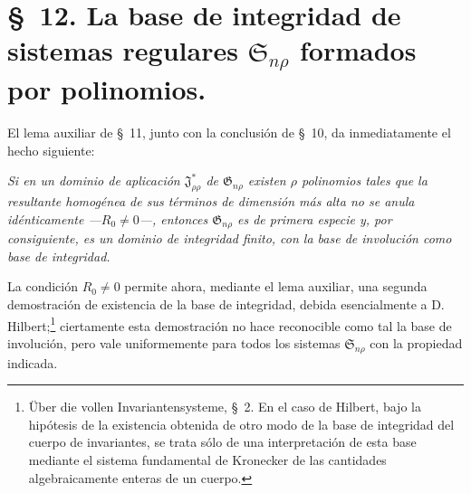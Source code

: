 \documentclass[11pt]{article}
\providecommand{\Ssys}{\mathfrak{S}}
\providecommand{\Jdom}{\mathfrak{J}}
\providecommand{\Gdom}{\mathfrak{G}}
\begin{document}
\section*{\S\ 12. La base de integridad de sistemas regulares $\Ssys_{n\rho}$ formados por polinomios.}

El lema auxiliar de \S\ 11, junto con la conclusión de \S\ 10, da inmediatamente el hecho siguiente:

\emph{Si en un dominio de aplicación $\Jdom^*_{\rho\rho}$ de $\Gdom_{n\rho}$ existen $\rho$ polinomios tales que la resultante homogénea de sus términos de dimensión más alta no se anula idénticamente ---$R_0\ne0$---, entonces $\Gdom_{n\rho}$ es de primera especie y, por consiguiente, es un dominio de integridad finito, con la base de involución como base de integridad.}

La condición $R_0\ne0$ permite ahora, mediante el lema auxiliar, una segunda demostración de existencia de la base de integridad, debida esencialmente a D. Hilbert;\footnote{Über die vollen Invariantensysteme, \S\ 2. En el caso de Hilbert, bajo la hipótesis de la existencia obtenida de otro modo de la base de integridad del cuerpo de invariantes, se trata sólo de una interpretación de esta base mediante el sistema fundamental de Kronecker de las cantidades algebraicamente enteras de un cuerpo.} ciertamente esta demostración no hace reconocible como tal la base de involución, pero vale uniformemente para todos los sistemas $\Ssys_{n\rho}$ con la propiedad indicada.
\end{document}
